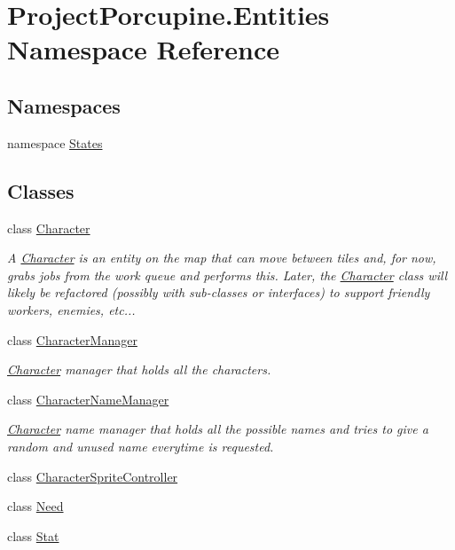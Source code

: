 \hypertarget{namespace_project_porcupine_1_1_entities}{}\section{Project\+Porcupine.\+Entities Namespace Reference}
\label{namespace_project_porcupine_1_1_entities}
\subsection*{Namespaces}
\begin{DoxyCompactItemize}
\item 
namespace \hyperlink{namespace_project_porcupine_1_1_entities_1_1_states}{States}
\end{DoxyCompactItemize}
\subsection*{Classes}
\begin{DoxyCompactItemize}
\item 
class \hyperlink{class_project_porcupine_1_1_entities_1_1_character}{Character}
\begin{DoxyCompactList}\small\item\em A \hyperlink{class_project_porcupine_1_1_entities_1_1_character}{Character} is an entity on the map that can move between tiles and, for now, grabs jobs from the work queue and performs this. Later, the \hyperlink{class_project_porcupine_1_1_entities_1_1_character}{Character} class will likely be refactored (possibly with sub-\/classes or interfaces) to support friendly workers, enemies, etc... \end{DoxyCompactList}\item 
class \hyperlink{class_project_porcupine_1_1_entities_1_1_character_manager}{Character\+Manager}
\begin{DoxyCompactList}\small\item\em \hyperlink{class_project_porcupine_1_1_entities_1_1_character}{Character} manager that holds all the characters. \end{DoxyCompactList}\item 
class \hyperlink{class_project_porcupine_1_1_entities_1_1_character_name_manager}{Character\+Name\+Manager}
\begin{DoxyCompactList}\small\item\em \hyperlink{class_project_porcupine_1_1_entities_1_1_character}{Character} name manager that holds all the possible names and tries to give a random and unused name everytime is requested. \end{DoxyCompactList}\item 
class \hyperlink{class_project_porcupine_1_1_entities_1_1_character_sprite_controller}{Character\+Sprite\+Controller}
\item 
class \hyperlink{class_project_porcupine_1_1_entities_1_1_need}{Need}
\item 
class \hyperlink{class_project_porcupine_1_1_entities_1_1_stat}{Stat}
\end{DoxyCompactItemize}
